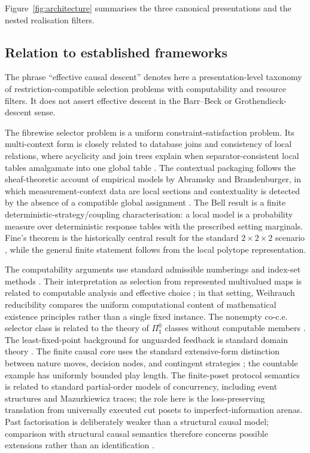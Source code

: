 \documentclass[11pt]{article}
\theoremstyle{plain}
\theoremstyle{definition}
\theoremstyle{remark}
\begin{document}
Figure~\ref{fig:architecture} summarises the three canonical presentations and the nested realisation filters.

\subsection*{Relation to established frameworks}

The phrase ``effective causal descent'' denotes here a presentation-level
taxonomy of restriction-compatible selection problems with computability and
resource filters. It does not assert effective descent in the Barr--Beck or
Grothendieck-descent sense.

The fibrewise selector problem is a uniform constraint-satisfaction problem. Its
multi-context form is closely related to database joins and consistency of local
relations, where acyclicity and join trees explain when separator-consistent
local tables amalgamate into one global table \cite{beerifagin}. The contextual
packaging follows the sheaf-theoretic account of empirical models by Abramsky and
Brandenburger, in which measurement-context data are local sections and
contextuality is detected by the absence of a compatible global assignment
\cite{abramsky}. The Bell result is a finite deterministic-strategy/coupling
characterisation: a local model is a probability measure over deterministic
response tables with the prescribed setting marginals. Fine's theorem is the
historically central result for the standard $2\times2\times2$ scenario
\cite{fine}, while the general finite statement follows from the local polytope
representation.

The computability arguments use standard admissible numberings and index-set
methods \cite{kleene,rogers,soare}. Their interpretation as selection from
represented multivalued maps is related to computable analysis and effective
choice \cite{weihrauch}; in that setting, Weihrauch reducibility compares the
uniform computational content of mathematical existence principles rather than a
single fixed instance. The nonempty co-c.e. selector class is related to the
theory of $\Pi^0_1$ classes without computable members \cite{jockuschsoare}.
The least-fixed-point background for unguarded feedback is standard domain
theory \cite{abramskyjung}. The finite causal core uses the standard
extensive-form distinction between nature moves, decision nodes, and contingent
strategies \cite{osbornerubinstein}; the countable example has uniformly bounded
play length. The finite-poset protocol semantics is related to standard
partial-order models of concurrency, including event structures and Mazurkiewicz
traces; the role here is the loss-preserving translation from universally
executed cut posets to imperfect-information arenas. Past factorisation is
deliberately weaker than a structural causal model; comparison with structural
causal semantics therefore concerns possible extensions rather than an
identification \cite{pearl}.
\end{document}
